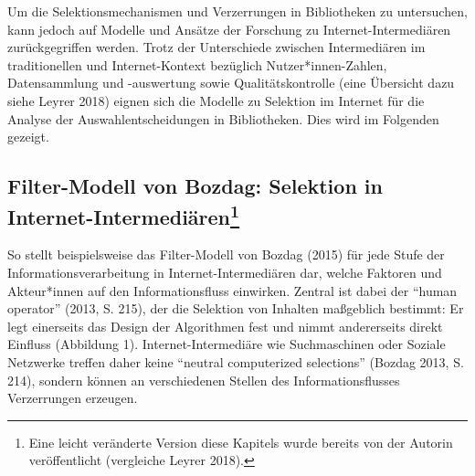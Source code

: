 \documentclass[a4paper,
fontsize=11pt,
oneside,
numbers=noperiodatend,
parskip=half-,
bibliography=totoc,
final
]{scrartcl}
\begin{document}
Um die Selektionsmechanismen und Verzerrungen in Bibliotheken zu
untersuchen, kann jedoch auf Modelle und Ansätze der Forschung zu
Internet-Intermediären zurückgegriffen werden. Trotz der Unterschiede
zwischen Intermediären im traditionellen und Internet-Kontext bezüglich
Nutzer*innen-Zahlen, Datensammlung und -auswertung sowie
Qualitätskontrolle (eine Übersicht dazu siehe Leyrer 2018) eignen sich
die Modelle zu Selektion im Internet für die Analyse der
Auswahlentscheidungen in Bibliotheken. Dies wird im Folgenden gezeigt.

\hypertarget{filter-modell-von-bozdag-selektion-in-internet-intermediuxe4ren1}{%
\subsection[Filter-Modell von Bozdag: Selektion in
Internet-Intermediären]{\texorpdfstring{Filter-Modell von Bozdag:
Selektion in Internet-Intermediären\footnote{Eine leicht veränderte
  Version diese Kapitels wurde bereits von der Autorin veröffentlicht
  (vergleiche Leyrer 2018).}}{Filter-Modell von Bozdag: Selektion in Internet-Intermediären}}\label{filter-modell-von-bozdag-selektion-in-internet-intermediuxe4ren1}}

So stellt beispielsweise das Filter-Modell von Bozdag (2015) für jede
Stufe der Informationsverarbeitung in Internet-Intermediären dar, welche
Faktoren und Akteur*innen auf den Informationsfluss einwirken. Zentral
ist dabei der \enquote{human operator} (2013, S. 215), der die Selektion
von Inhalten maßgeblich bestimmt: Er legt einerseits das Design der
Algorithmen fest und nimmt andererseits direkt Einfluss (Abbildung 1).
Internet-Intermediäre wie Suchmaschinen oder Soziale Netzwerke treffen
daher keine \enquote{neutral computerized selections} (Bozdag 2013, S.
214), sondern können an verschiedenen Stellen des Informationsflusses
Verzerrungen erzeugen.
\end{document}
